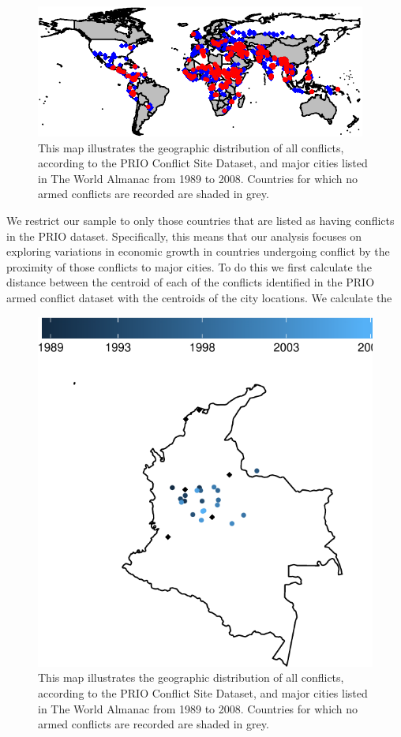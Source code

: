 \begin{figure}[ht]
	\centering
	\includegraphics[width=.9\textwidth]{CityConfMap-crop}
	\caption{This map illustrates the geographic distribution of all conflicts, according to the PRIO Conflict Site Dataset, and major cities listed in The World Almanac from 1989 to 2008. Countries for which no armed conflicts are recorded are shaded in grey.}
	\label{fig:CityConfMap}
\end{figure}

We restrict our sample to only those countries that are listed as having conflicts in the PRIO dataset. Specifically, this means that our analysis focuses on exploring variations in economic growth in countries undergoing conflict by the proximity of those conflicts to major cities. To do this we first calculate the distance between the centroid of each of the conflicts identified in the PRIO armed conflict dataset with the centroids of the city locations. We calculate the 

\begin{figure}[ht]
	\centering
	\includegraphics[width=.7\textwidth]{colombiaMap-crop}
	\caption{This map illustrates the geographic distribution of all conflicts, according to the PRIO Conflict Site Dataset, and major cities listed in The World Almanac from 1989 to 2008. Countries for which no armed conflicts are recorded are shaded in grey.}
	\label{fig:CityConfMap}
\end{figure}

